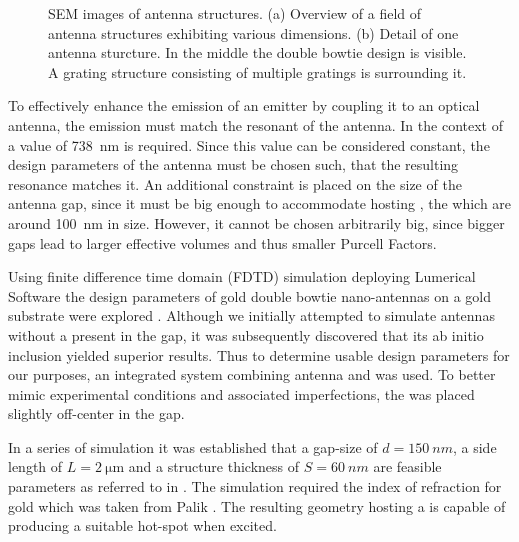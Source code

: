 \begin{figure}[!htb]
\begin{subfigure}{ 0.49\linewidth}
		 				\caption{}
		 				\label{subfig::antenna_one_structure_sem}
		 			\end{subfigure}
		 			\caption[SEM images of double bowtie structures.]{SEM images of antenna structures. (a) Overview of a field of antenna structures exhibiting various dimensions. (b) Detail of one antenna sturcture. In the middle the double bowtie design is visible. A grating structure consisting of multiple gratings is surrounding it.}
		 		\end{figure}

		To effectively enhance the emission of an emitter by coupling it to an optical antenna, the emission \wl must match the resonant \wl of the antenna. In the context of \sivs a value of \SI{738}{nm} is required. Since this value can be considered constant, the design parameters of the antenna must be chosen such, that the resulting resonance matches it. An additional constraint is placed on the size of the antenna gap, since it must be big enough to accommodate \nds hosting \sivs, the which are around \SI{100}{\nm} in size. However, it cannot be chosen arbitrarily big, since bigger gaps lead to larger effective volumes and thus smaller Purcell Factors.
		
		Using finite difference time domain (FDTD) simulation deploying Lumerical Software the design parameters of gold double bowtie nano-antennas on a gold substrate were explored \cite{rahbany2016towards}. Although we initially attempted to simulate antennas without a \nd present in the gap, it was subsequently discovered that its ab initio inclusion yielded superior results. Thus to determine usable design parameters for our purposes, an integrated system combining antenna and \nd was used. To better mimic experimental conditions and associated imperfections, the \nd was placed slightly off-center in the gap.
		
		In a series of simulation it was established that a gap-size of $d = \SI{150}{nm}$, a side length of $L = \SI{2}{\micro\meter}$ and a structure thickness of $S = \SI{60}{nm}$ are feasible parameters as referred to in . The simulation required the index of refraction for gold which was taken from Palik \cite{ghosh1998handbook}.
		The resulting geometry hosting a \nd is capable of producing a suitable hot-spot when excited.

